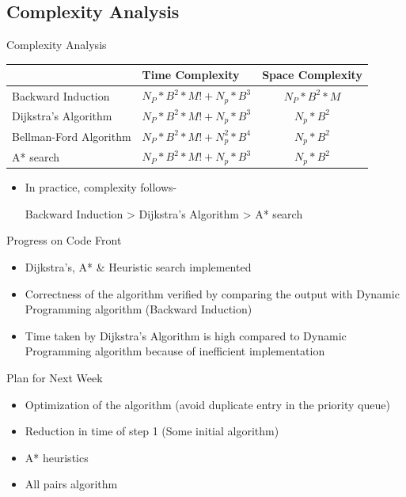 \documentclass{beamer}
\begin{document}
\subsection{Complexity Analysis}
\begin{frame}{Complexity Analysis}
\begin{table}
\begin{tabular}{|p{2.5cm}|p{4cm}|c|}
\hline
 & \textbf{Time Complexity} & \textbf{Space Complexity} \\
\hline
Backward Induction & $N_P*B^{2}*M! + N_p*B^3$ & $N_P*B^{2}*M$ \\
\hline
Dijkstra's Algorithm & $N_P*B^{2}*M! + N_p*B^3$ & $N_p*B^2$ \\
\hline
Bellman-Ford Algorithm & $N_P*B^{2}*M! + N_p^2*B^4$ & $N_p*B^2$ \\
\hline
A* search & $N_P*B^{2}*M! + N_p*B^3$ & $N_p*B^2$ \\
\hline
\end{tabular}
\end{table}
\begin{itemize}
\item In practice, complexity follows-
\begin{center}
Backward Induction > Dijkstra's Algorithm > A* search
\end{center}
\end{itemize}
\end{frame}

\begin{frame}{Progress on Code Front}
\begin{itemize}
\item Dijkstra's, A* \& Heuristic search implemented
\item Correctness of the algorithm verified by comparing the output with Dynamic Programming algorithm (Backward Induction)
\item Time taken by Dijkstra's Algorithm is high compared to Dynamic Programming algorithm because of inefficient implementation
\end{itemize}
\end{frame}

\begin{frame}{Plan for Next Week}
\begin{itemize}
\item Optimization of the algorithm (avoid duplicate entry in the priority queue)
\item Reduction in time of step 1 (Some initial algorithm)
\item A* heuristics
\item All pairs algorithm
\end{itemize}
\end{frame}
\end{document}
